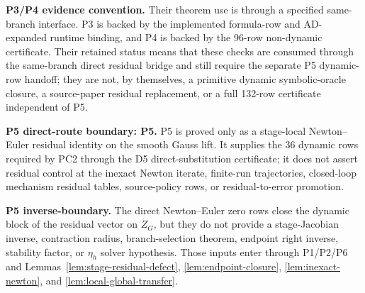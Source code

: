 \documentclass[preprint,12pt]{elsarticle}
\begin{document}
\noindent\textbf{P3/P4 evidence convention.}
Their theorem use is through a specified
same-branch interface. P3 is backed by the implemented formula-row and
AD-expanded runtime binding, and P4 is backed by the 96-row non-dynamic
certificate. Their retained status means
that these checks are consumed through the same-branch direct residual bridge
and still require the separate P5 dynamic-row handoff; they are not, by
themselves, a primitive dynamic symbolic-oracle closure, a source-paper
residual replacement, or a full 132-row certificate independent of P5.

\noindent\textbf{P5 direct-route boundary: P5.}
P5 is proved only as a stage-local
Newton--Euler residual identity on the smooth Gauss lift. It
supplies the 36 dynamic rows required by PC2 through the D5 direct-substitution
certificate; it does not assert residual control at the inexact Newton
iterate, finite-run trajectories, closed-loop mechanism residual tables,
source-policy rows, or residual-to-error promotion.

\noindent\textbf{P5 inverse-boundary.}
The direct Newton--Euler zero rows close
the dynamic block of the residual vector on \(Z_G\), but they do not provide a
stage-Jacobian inverse, contraction radius, branch-selection theorem,
endpoint right inverse, stability factor, or \(\eta_h\) solver hypothesis. Those
inputs enter through P1/P2/P6 and Lemmas~\ref{lem:stage-residual-defect},
\ref{lem:endpoint-closure}, \ref{lem:inexact-newton}, and
\ref{lem:local-global-transfer}.
\end{document}
